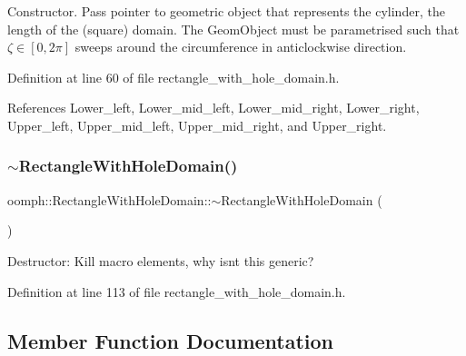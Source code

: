 Constructor. Pass pointer to geometric object that represents the cylinder, the length of the (square) domain. The Geom\+Object must be parametrised such that $\zeta \in [0,2\pi]$ sweeps around the circumference in anticlockwise direction. 



Definition at line 60 of file rectangle\+\_\+with\+\_\+hole\+\_\+domain.\+h.



References Lower\+\_\+left, Lower\+\_\+mid\+\_\+left, Lower\+\_\+mid\+\_\+right, Lower\+\_\+right, Upper\+\_\+left, Upper\+\_\+mid\+\_\+left, Upper\+\_\+mid\+\_\+right, and Upper\+\_\+right.

\mbox{\label{classoomph_1_1RectangleWithHoleDomain_adae7fabe3167ec35c1c0d4af813a4dca}} 
\subsubsection{\texorpdfstring{$\sim$\+Rectangle\+With\+Hole\+Domain()}{~RectangleWithHoleDomain()}}
{\footnotesize\ttfamily oomph\+::\+Rectangle\+With\+Hole\+Domain\+::$\sim$\+Rectangle\+With\+Hole\+Domain (\begin{DoxyParamCaption}{ }\end{DoxyParamCaption})\hspace{0.3cm}{\ttfamily [inline]}}



Destructor\+: Kill macro elements, why isn\textquotesingle{}t this generic? 



Definition at line 113 of file rectangle\+\_\+with\+\_\+hole\+\_\+domain.\+h.



\subsection{Member Function Documentation}
\mbox{\label{classoomph_1_1RectangleWithHoleDomain_a9548ab705821b22c43850b658a893fd8}} 
